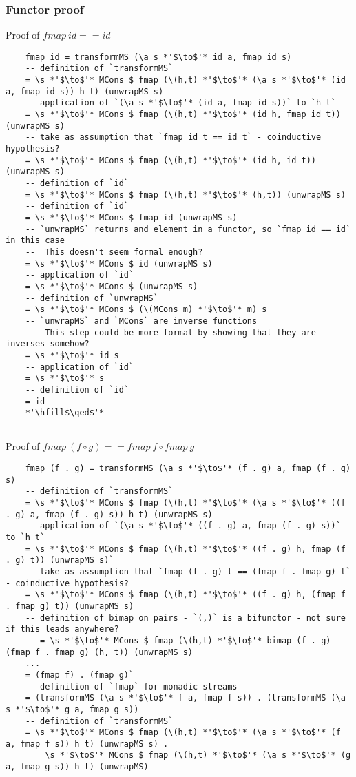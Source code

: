 \documentclass{article}
\begin{document}
\subsubsection{Functor proof}

Proof of $fmap\ id == id$\\

\begin{lstlisting}
	fmap id = transformMS (\a s *'$\to$'* id a, fmap id s)
	-- definition of `transformMS`
	= \s *'$\to$'* MCons $ fmap (\(h,t) *'$\to$'* (\a s *'$\to$'* (id a, fmap id s)) h t) (unwrapMS s)
	-- application of `(\a s *'$\to$'* (id a, fmap id s))` to `h t`
	= \s *'$\to$'* MCons $ fmap (\(h,t) *'$\to$'* (id h, fmap id t)) (unwrapMS s)
	-- take as assumption that `fmap id t == id t` - coinductive hypothesis?
	= \s *'$\to$'* MCons $ fmap (\(h,t) *'$\to$'* (id h, id t)) (unwrapMS s)
	-- definition of `id`
	= \s *'$\to$'* MCons $ fmap (\(h,t) *'$\to$'* (h,t)) (unwrapMS s)
	-- definition of `id`
	= \s *'$\to$'* MCons $ fmap id (unwrapMS s)
	-- `unwrapMS` returns and element in a functor, so `fmap id == id` in this case 
	--  This doesn't seem formal enough?
	= \s *'$\to$'* MCons $ id (unwrapMS s)
	-- application of `id`
	= \s *'$\to$'* MCons $ (unwrapMS s)
	-- definition of `unwrapMS`
	= \s *'$\to$'* MCons $ (\(MCons m) *'$\to$'* m) s
	-- `unwrapMS` and `MCons` are inverse functions
	--  This step could be more formal by showing that they are inverses somehow?
	= \s *'$\to$'* id s 
	-- application of `id`
	= \s *'$\to$'* s
	-- definition of `id`
	= id
	*'\hfill$\qed$'*
	
\end{lstlisting}
Proof of $fmap\ (f \circ g) == fmap\ f \circ fmap\ g $

\begin{lstlisting}
	fmap (f . g) = transformMS (\a s *'$\to$'* (f . g) a, fmap (f . g) s)
	-- definition of `transformMS`
	= \s *'$\to$'* MCons $ fmap (\(h,t) *'$\to$'* (\a s *'$\to$'* ((f . g) a, fmap (f . g) s)) h t) (unwrapMS s)
	-- application of `(\a s *'$\to$'* ((f . g) a, fmap (f . g) s))` to `h t`
	= \s *'$\to$'* MCons $ fmap (\(h,t) *'$\to$'* ((f . g) h, fmap (f . g) t)) (unwrapMS s)`
	-- take as assumption that `fmap (f . g) t == (fmap f . fmap g) t` - coinductive hypothesis?
	= \s *'$\to$'* MCons $ fmap (\(h,t) *'$\to$'* ((f . g) h, (fmap f . fmap g) t)) (unwrapMS s)
	-- definition of bimap on pairs - `(,)` is a bifunctor - not sure if this leads anywhere?
	-- = \s *'$\to$'* MCons $ fmap (\(h,t) *'$\to$'* bimap (f . g) (fmap f . fmap g) (h, t)) (unwrapMS s)
	...
	= (fmap f) . (fmap g)`
	-- definition of `fmap` for monadic streams
	= (transformMS (\a s *'$\to$'* f a, fmap f s)) . (transformMS (\a s *'$\to$'* g a, fmap g s))
	-- definition of `transformMS`
	= \s *'$\to$'* MCons $ fmap (\(h,t) *'$\to$'* (\a s *'$\to$'* (f a, fmap f s)) h t) (unwrapMS s) . 
		\s *'$\to$'* MCons $ fmap (\(h,t) *'$\to$'* (\a s *'$\to$'* (g a, fmap g s)) h t) (unwrapMS)
\end{lstlisting}
\end{document}
